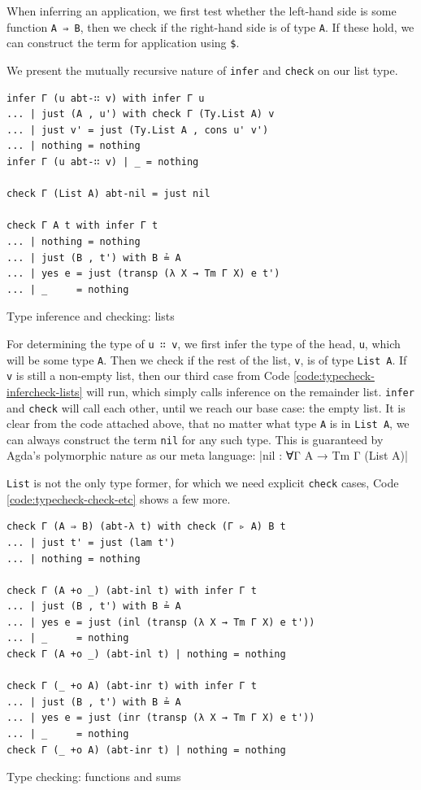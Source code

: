 When inferring an application, we first test whether the left-hand side is some function \verb$A ⇒ B$, then we check if the right-hand side is of type \verb$A$. If these hold, we can construct the term for application using \verb$$\verb=$=\verb$$.

We present the mutually recursive nature of \verb$infer$ and \verb$check$ on our list type.

\begin{listing}[H]
\begin{verbatim}
infer Γ (u abt-∷ v) with infer Γ u
... | just (A , u') with check Γ (Ty.List A) v
... | just v' = just (Ty.List A , cons u' v')
... | nothing = nothing
infer Γ (u abt-∷ v) | _ = nothing

check Γ (List A) abt-nil = just nil

check Γ A t with infer Γ t
... | nothing = nothing
... | just (B , t') with B ≟ A
... | yes e = just (transp (λ X → Tm Γ X) e t')
... | _     = nothing
\end{verbatim}
\caption{Type inference and checking: lists}
\label{code:typecheck-infercheck-lists}
\end{listing}

For determining the type of \verb$u ∷ v$, we first infer the type of the head, \verb$u$, which will be some type \verb$A$. Then we check if the rest of the list, \verb$v$, is of type \verb$List A$. If \verb$v$ is still a non-empty list, then our third case from Code \ref{code:typecheck-infercheck-lists} will run, which simply calls inference on the remainder list. \verb$infer$ and \verb$check$ will call each other, until we reach our base case: the empty list. It is clear from the code attached above, that no matter what type \verb$A$ is in \verb$List A$, we can always construct the term \verb$nil$ for any such type. This is guaranteed by Agda's polymorphic nature as our meta language:
|nil : ∀{Γ A} → Tm Γ (List A)|

\verb$List$ is not the only type former, for which we need explicit \verb$check$ cases, Code \ref{code:typecheck-check-etc} shows a few more.

\begin{listing}[H]
\begin{verbatim}
check Γ (A ⇒ B) (abt-λ t) with check (Γ ▹ A) B t
... | just t' = just (lam t')
... | nothing = nothing

check Γ (A +o _) (abt-inl t) with infer Γ t
... | just (B , t') with B ≟ A
... | yes e = just (inl (transp (λ X → Tm Γ X) e t'))
... | _     = nothing
check Γ (A +o _) (abt-inl t) | nothing = nothing

check Γ (_ +o A) (abt-inr t) with infer Γ t
... | just (B , t') with B ≟ A
... | yes e = just (inr (transp (λ X → Tm Γ X) e t'))
... | _     = nothing
check Γ (_ +o A) (abt-inr t) | nothing = nothing
\end{verbatim}
\caption{Type checking: functions and sums}
\label{code:typecheck-check-etc}
\end{listing}

